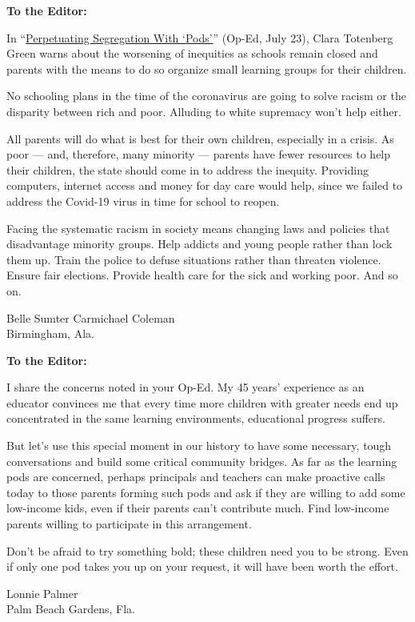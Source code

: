\textbf{To the Editor:}

In
``\href{https://www.nytimes3xbfgragh.onion/2020/07/22/opinion/pandemic-pods-schools.html?searchResultPosition=1}{Perpetuating
Segregation With `Pods'}'' (Op-Ed, July 23), Clara Totenberg Green warns
about the worsening of inequities as schools remain closed and parents
with the means to do so organize small learning groups for their
children.

No schooling plans in the time of the coronavirus are going to solve
racism or the disparity between rich and poor. Alluding to white
supremacy won't help either.

All parents will do what is best for their own children, especially in a
crisis. As poor --- and, therefore, many minority --- parents have fewer
resources to help their children, the state should come in to address
the inequity. Providing computers, internet access and money for day
care would help, since we failed to address the Covid-19 virus in time
for school to reopen.

Facing the systematic racism in society means changing laws and policies
that disadvantage minority groups. Help addicts and young people rather
than lock them up. Train the police to defuse situations rather than
threaten violence. Ensure fair elections. Provide health care for the
sick and working poor. And so on.

Belle Sumter Carmichael Coleman\\
Birmingham, Ala.

\textbf{To the Editor:}

I share the concerns noted in your Op-Ed. My 45 years' experience as an
educator convinces me that every time more children with greater needs
end up concentrated in the same learning environments, educational
progress suffers.

But let's use this special moment in our history to have some necessary,
tough conversations and build some critical community bridges. As far as
the learning pods are concerned, perhaps principals and teachers can
make proactive calls today to those parents forming such pods and ask if
they are willing to add some low-income kids, even if their parents
can't contribute much. Find low-income parents willing to participate in
this arrangement.

Don't be afraid to try something bold; these children need you to be
strong. Even if only one pod takes you up on your request, it will have
been worth the effort.

Lonnie Palmer\\
Palm Beach Gardens, Fla.

